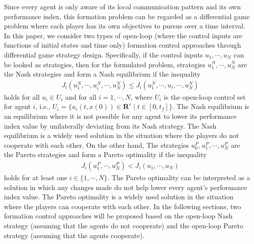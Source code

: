 \documentclass[10pt,doublecolumn]{IEEEtran}  %
\begin{document}
Since every agent is only aware of its local communication pattern and its own performance index, this formation problem can be regarded as a differential game problem where each player {has} its own objectives to pursue over a time interval. In this paper, we consider two types of open-loop {(where the control inputs are functions of initial states and time only)} formation control approaches through {differential} game strategy design. Specifically, {if the control inputs $u_1,\cdots,u_N$ can be looked as strategies}, then for the formulated problem, strategies {$u^{N}_{1},\cdots,u^{N}_N$} are the Nash strategies and form a Nash equilibrium if the inequality
\begin{align}
&{J_{i}(u_1^{N},\cdots,u^{N}_i,\cdots,u^{N}_N)\leq J_{i}(u_1^{N},\cdots,u_i,\cdots,u^{N}_N)}\label{Nashinequality}
\end{align}
holds for all $u_i\in U_i$ and for all $i=1,\cdots,N$, where $U_i$ is the open-loop control set for agent $i$, i.e., $U_i=\{u_i(t,x(0))\in \mathbf{R}^r \mid t\in[0,t_f]\}$. The Nash equilibrium is an equilibrium where it is not possible for any agent to lower its performance index value by unilaterally deviating from its Nash strategy. The Nash equilibrium is a widely used solution in the situation where the players do not {cooperate} with each other. On the other hand, The strategies $u^{P}_0,u^{P}_{1},\cdots,u^{P}_N$ are the Pareto strategies and {form a Pareto optimality if the inequality
\begin{align}
&J_{i}(u^P_1,\cdots,u^P_N)< J_{i}(u_1,\cdots,u_N) \label{inequality}
\end{align}
holds for at least one $i\in\{1,\cdots,N\}$.} The Pareto optimality can be interpreted as a solution in which any changes made do not help lower every agent's performance index value. The Pareto optimality is a widely used solution in the situation where the players can {cooperate} with each other. In the following sections, two formation control approaches will be proposed based on the open-loop Nash strategy (assuming that the agents do not {cooperate}) and the open-loop Pareto strategy (assuming that the agents {cooperate}).
\end{document}
